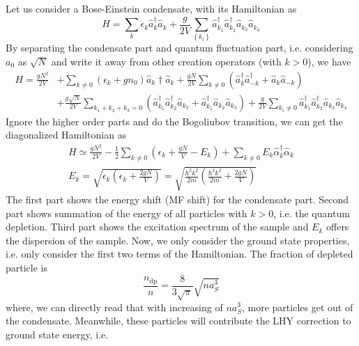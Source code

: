 Let us consider a Bose-Einstein condensate, with its Hamiltonian as
\begin{equation}
H=\sum_k\epsilon_k\hat{a}_k^\dagger\hat{a}_k+\frac{g}{2V}\sum_{\left\{k_i\right\}}\hat{a}_{k_1}^\dagger\hat{a}_{k_2}^\dagger\hat{a}_{k_3}\hat{a}_{k_4}
\end{equation}
By separating the condensate part and quantum fluctuation part, i.e. considering $a_0$ as $\sqrt{N}$ and write it away from other creation operators (with $k>0$), we have
\begin{equation}
\begin{split}
H=\frac{g N^2}{2V}&+\sum_{k\neq0}\left(\epsilon_k+gn_0\right)\hat{a}_k\dagger\hat{a}_k+\frac{gN}{2V}\sum_{k\neq0}\left(\hat{a}_k^\dagger\hat{a}_{-k}^\dagger+\hat{a}_k\hat{a}_{-k}\right)\\
&+\frac{g\sqrt{N}}{2V}\sum_{k_1+k_2+k_3=0}\left(\hat{a}_{k_1}^\dagger\hat{a}_{k_2}^\dagger\hat{a}_{k_3}+\hat{a}_{k_1}^\dagger\hat{a}_{k_2}\hat{a}_{k_3}\right)+\frac{g}{2V}\sum_{k_i\neq0}\hat{a}_{k_1}^\dagger\hat{a}_{k_2}^\dagger\hat{a}_{k_3}\hat{a}_{k_4}
\end{split}
\end{equation}
Ignore the higher order parts and do the Bogoliubov transition, we can get the diagonalized Hamiltonian as
\begin{equation}
\begin{split}
H\simeq \frac{g N^2}{2V}-\frac{1}{2}\sum _{k\neq 0} \left(\epsilon _k+\frac{g N}{V}-E_k\right)+\sum _{k\neq 0} E_k\hat{\alpha }_k^\dagger\hat{\alpha}_k\\
E_k=\sqrt{\epsilon_k\left(\epsilon_k+\frac{2gN}{V}\right)}=\sqrt{\frac{\hbar^2k^2}{2m}\left(\frac{\hbar^2k^2}{2m}+\frac{2gN}{V}\right)}
\end{split}
\end{equation}
The first part shows the energy shift (MF shift) for the condensate part. Second part shows summation of the energy of all particles with $k>0$, i.e. the quantum depletion. Third part shows the excitation spectrum of the sample and $E_k$ offers the dispersion of the sample. Now, we only consider the ground state properties, i.e. only consider the first two terms of the Hamiltonian. The fraction of depleted particle is
\begin{equation}
\frac{n_{\text{dp}}}{n}=\frac{8}{3\sqrt{\pi }}\sqrt{n a_S^3}
\end{equation}
where, we can directly read that with increasing of $n a_S^3$, more particles get out of the condensate. Meanwhile, these particles will contribute the LHY correction to ground state energy, i.e.
